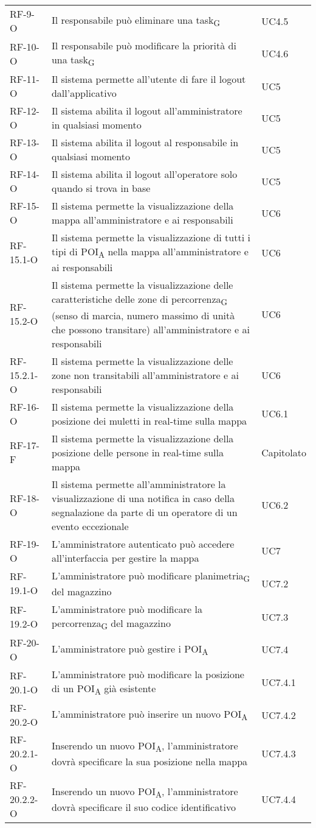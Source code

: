\begin{longtable}{ 
		>{}p{} 
		>{}p{}
		>{\centering}p{} }
RF-9-O		&	Il responsabile può eliminare una task\textsubscript{G} 	&	UC4.5\tabularnewline
RF-10-O		&	Il responsabile può modificare la priorità di una task\textsubscript{G} 	&	UC4.6\tabularnewline				
RF-11-O		&	Il sistema permette all'utente di fare il logout dall'applicativo	&	UC5\tabularnewline
RF-12-O		&	Il sistema abilita il logout all'amministratore in qualsiasi momento	&	UC5\tabularnewline
RF-13-O		&	Il sistema abilita il logout al responsabile in qualsiasi momento	&	UC5\tabularnewline
RF-14-O		&	Il sistema abilita il logout all'operatore solo quando si trova in base 	&	UC5\tabularnewline				
RF-15-O		&	Il sistema permette la visualizzazione della mappa all'amministratore e ai responsabili	&	UC6\tabularnewline
RF-15.1-O		&	Il sistema permette la visualizzazione di tutti i tipi di POI\textsubscript{A} nella mappa all'amministratore e ai responsabili	&	UC6\tabularnewline
RF-15.2-O		&	Il sistema permette la visualizzazione delle caratteristiche delle zone di percorrenza\textsubscript{G} (senso di marcia, numero massimo di unità che possono transitare) all'amministratore e ai responsabili	& UC6\tabularnewline
RF-15.2.1-O	&	Il sistema permette la visualizzazione delle zone non transitabili all'amministratore e ai responsabili	&	UC6 \tabularnewline
RF-16-O		&	Il sistema permette la visualizzazione della posizione dei muletti in real-time sulla mappa	&	UC6.1\tabularnewline
RF-17-F		&	Il sistema permette la visualizzazione della posizione delle persone in real-time sulla mappa	&	Capitolato\tabularnewline
RF-18-O		&	Il sistema permette all'amministratore la visualizzazione di una notifica in caso della segnalazione da parte di un operatore di un evento eccezionale	&	UC6.2\tabularnewline				
RF-19-O		&	L'amministratore autenticato può accedere all'interfaccia per gestire la mappa 	&	UC7\tabularnewline
RF-19.1-O		&	L'amministratore può modificare planimetria\textsubscript{G} del magazzino	&	UC7.2\tabularnewline
RF-19.2-O		&	L'amministratore può modificare la percorrenza\textsubscript{G} del magazzino	&	UC7.3\tabularnewline
RF-20-O		&	L'amministratore può gestire i POI\textsubscript{A}	&	UC7.4\tabularnewline
RF-20.1-O		&	L'amministratore può modificare la posizione di un POI\textsubscript{A} già esistente	&	UC7.4.1\tabularnewline
RF-20.2-O		&	L'amministratore può inserire un nuovo POI\textsubscript{A}	&	UC7.4.2\tabularnewline
RF-20.2.1-O	&	Inserendo un nuovo POI\textsubscript{A}, l'amministratore dovrà specificare la sua posizione nella mappa	&	UC7.4.3\tabularnewline
RF-20.2.2-O	&	Inserendo un nuovo POI\textsubscript{A}, l'amministratore dovrà specificare il suo codice identificativo	&	UC7.4.4\tabularnewline

\end{longtable}
